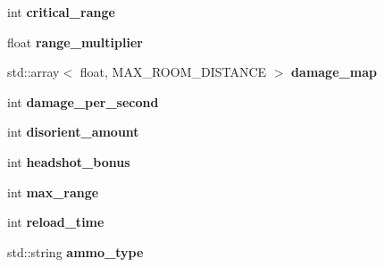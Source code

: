 \begin{DoxyCompactItemize}
int {\bfseries critical\+\_\+range}
\item 
\mbox{\label{structmods_1_1weapon_1_1yaml_1_1rifle__description__t_a8d7ad2ce5f07d137b4acf949b06d0289}} 
float {\bfseries range\+\_\+multiplier}
\item 
\mbox{\label{structmods_1_1weapon_1_1yaml_1_1rifle__description__t_a01288d9d082fab196c3a4ef83330af47}} 
std\+::array$<$ float, M\+A\+X\+\_\+\+R\+O\+O\+M\+\_\+\+D\+I\+S\+T\+A\+N\+CE $>$ {\bfseries damage\+\_\+map}
\item 
\mbox{\label{structmods_1_1weapon_1_1yaml_1_1rifle__description__t_a0391a072e992ca20bf7ab9eb8fbb598e}} 
int {\bfseries damage\+\_\+per\+\_\+second}
\item 
\mbox{\label{structmods_1_1weapon_1_1yaml_1_1rifle__description__t_a464bf5e04114f18b7a00e9fec82640d0}} 
int {\bfseries disorient\+\_\+amount}
\item 
\mbox{\label{structmods_1_1weapon_1_1yaml_1_1rifle__description__t_a2ae558e52e7dbe40f12544861345c16b}} 
int {\bfseries headshot\+\_\+bonus}
\item 
\mbox{\label{structmods_1_1weapon_1_1yaml_1_1rifle__description__t_a8e7f9786e4e0af4b9af21d8a511abd70}} 
int {\bfseries max\+\_\+range}
\item 
\mbox{\label{structmods_1_1weapon_1_1yaml_1_1rifle__description__t_af53fff679561713f72c980c134cccf90}} 
int {\bfseries reload\+\_\+time}
\item 
\mbox{\label{structmods_1_1weapon_1_1yaml_1_1rifle__description__t_ac448aa802ee7e5b79a7987cbc7694d48}} 
std\+::string {\bfseries ammo\+\_\+type}
\item 
\mbox{\label{structmods_1_1weapon_1_1yaml_1_1rifle__description__t_a6c68c7f72e2b612815f64ea6f2c33da1}} 

\end{DoxyCompactItemize}
